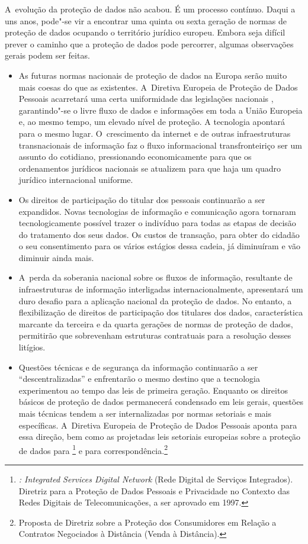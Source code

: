 A~evolução da proteção de dados não acabou. É um processo contínuo.
Daqui a uns anos, pode"-se vir a encontrar uma quinta ou sexta geração de
normas de proteção de dados ocupando o território jurídico europeu.
Embora seja difícil prever o caminho que a proteção de dados pode
percorrer, algumas observações gerais podem ser feitas.

\begin{itemize}
\item As futuras normas nacionais de proteção de dados na Europa serão muito
mais coesas do que as existentes. A~Diretiva Europeia de Proteção de
Dados Pessoais acarretará uma certa uniformidade das legislações
nacionais , garantindo"-se o livre fluxo de dados e informações em toda a
União Europeia e, ao mesmo tempo, um elevado nível de proteção. A
tecnologia apontará para o mesmo lugar. O~crescimento da internet e de
outras infraestruturas transnacionais de informação faz o fluxo
informacional transfronteiriço ser um assunto do cotidiano, pressionando
economicamente para que os ordenamentos jurídicos nacionais se atualizem
para que haja um quadro jurídico internacional uniforme.

\item Os direitos de participação do titular dos pessoais continuarão a ser
expandidos. Novas tecnologias de informação e comunicação agora tornaram
tecnologicamente possível trazer o indivíduo para todas as etapas de
decisão do tratamento dos seus dados. Os custos de transação, para obter
do cidadão o seu consentimento para os vários estágios dessa cadeia, já
diminuíram e vão diminuir ainda mais.

\item A~perda da soberania nacional sobre os fluxos de informação,
resultante de infraestruturas de informação interligadas
internacionalmente, apresentará um duro desafio para a aplicação
nacional da proteção de dados. No entanto, a flexibilização de direitos
de participação dos titulares dos dados, característica marcante da
terceira e da quarta gerações de normas de proteção de dados, permitirão
que sobrevenham estruturas contratuais para a resolução desses litígios.

\item Questões técnicas e de segurança da informação continuarão a ser
``descentralizadas'' e enfrentarão o mesmo destino que a tecnologia
experimentou ao tempo das leis de primeira geração. Enquanto os direitos
básicos de proteção de dados permanecerá condensado em leis gerais,
questões mais técnicas tendem a ser internalizadas por normas setoriais
e mais específicas. A~Diretiva Europeia de Proteção de Dados Pessoais
aponta para essa direção, bem como as projetadas leis setoriais
europeias sobre a proteção de dados para \footnote{\emph{:
  Integrated Services Digital Network} (Rede Digital de Serviços
  Integrados). Diretriz para a Proteção de Dados Pessoais e Privacidade
  no Contexto das Redes Digitais de Telecomunicações, a ser aprovado em
  1997.} e para correspondência.\footnote{Proposta de Diretriz sobre a
  Proteção dos Consumidores em Relação a Contratos Negociados à
  Distância (Venda à Distância).}


\end{itemize}
